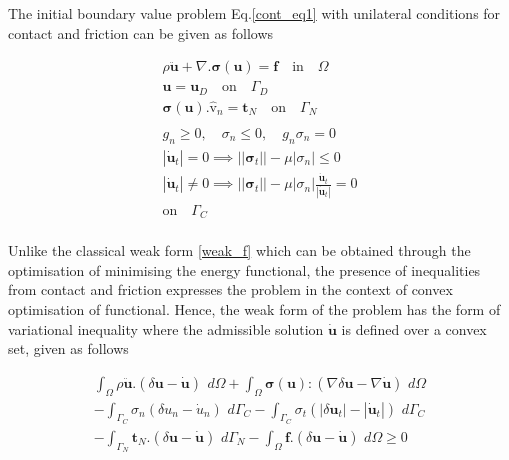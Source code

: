The initial boundary value problem Eq.\eqref{cont_eq1} with unilateral conditions for contact and friction can be given as follows

\begin{equation}\label{cont_eq2}
\begin{split}
\rho\bm{\ddot{u}}+\nabla.\bm{\sigma}(\bm{u}) = \bm{f}\quad \mathrm{in} \quad \Omega\\ 
\bm{u} = \bm{u}_D\quad \mathrm{on}\quad \Gamma_D\\
\bm{\sigma}(\bm{u}).\bm{\hat{\mathrm v}}_n=\bm{t}_N\quad\mathrm{on}\quad\Gamma_N\\
\\
g_n \geq 0,\quad {\sigma}_n \leq 0,\quad g_n {\sigma}_{n} = 0\quad \\
|\bm{\dot{u}}_t| = 0 \implies ||\bm\sigma_{t}||-\mu|\sigma_{n}| \leq 0\\
|\bm{\dot{u}}_t| \neq 0 \implies ||\bm\sigma_{t}||-\mu|\sigma_{n}|\frac{\bm{\dot{u}}_t}{|\bm{\dot{u}}_t|} = 0\\
\mathrm{on} \quad \Gamma_C\\
\end{split}
\end{equation}


Unlike the classical weak form \eqref{weak_f} which can be obtained through the optimisation of minimising the energy functional, the presence of inequalities from contact and friction expresses the problem in the context of convex optimisation of functional.  Hence, the weak form of the problem has the form of variational inequality where the admissible solution $\bm{\dot{u}}$ is defined over a convex set, given as follows



\begin{multline}\label{fric_con_raw}
\int_{\Omega}\rho\bm{\ddot{u}}.(\delta \bm{u}-\bm{\dot{u}}) \,\ d\Omega +\int_{\Omega}  \bm{\sigma}(\bm{u}):(\nabla \delta \bm{u}-\nabla \bm{\dot{u}}) \,\,d\Omega\\
 - \int_{\Gamma_C} \sigma_n(\delta{u}_n-{\dot{u}}_n) \,\, d\Gamma_C - \int_{\Gamma_C} \sigma_t(|\delta{\bm{u}}_t|-|{\dot{\bm{u}}}_t|) \,\, d\Gamma_C\\
  -  \int_{\Gamma_N} \bm{t}_N.(\delta \bm{u}-\bm{\dot{u}}) \,\, d\Gamma_N- \int_{\Omega} \bm{f}.(\delta \bm{u}-\bm{\dot{u}}) \,\, d\Omega \geq 0
\end{multline}



